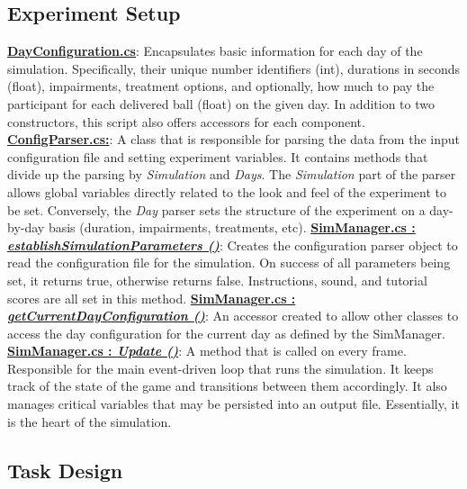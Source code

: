 \documentclass{article}
\begin{document}
\subsection*{Experiment Setup} 
\href{https://bit.ly/2FvRTWR}{\textbf{DayConfiguration.cs}}: Encapsulates basic information for each day of the simulation. Specifically, their unique number identifiers (int), durations in seconds (float), impairments, treatment options, and optionally, how much to pay the participant for each delivered ball (float) on the given day. In addition to two constructors, this script also offers accessors for each component. \newline \newline
\href{https://bit.ly/2TZaLYj}{\textbf{ConfigParser.cs:}}: A class that is responsible for parsing the data from the input configuration file and setting experiment variables. It contains methods that divide up the parsing by \textit{Simulation} and \textit{Days}. The \textit{Simulation} part of the parser allows global variables directly related to the look and feel of the experiment to be set. Conversely, the \textit{Day} parser sets the structure of the experiment on a day-by-day basis (duration, impairments, treatments, etc). 
\newline \newline
\href{https://bit.ly/2UhmSzq}{\textbf{SimManager.cs : \textit{establishSimulationParameters ()}}}: Creates the configuration parser object to read the configuration file for the simulation. On success of all parameters being set, it returns true, otherwise returns false. Instructions, sound, and tutorial scores are all set in this method. \newline \newline
\href{https://bit.ly/2UhmSzq}{\textbf{SimManager.cs : \textit{getCurrentDayConfiguration ()}}}: An accessor created to allow other classes to access the day configuration for the current day as defined by the SimManager. \newline \newline
\href{https://bit.ly/2UhmSzq}{\textbf{SimManager.cs : \textit{Update ()}}}: A method that is called on every frame. Responsible for the main event-driven loop that runs the simulation. It keeps track of the state of the game and transitions between them accordingly. It also manages critical variables that may be persisted into an output file. Essentially, it is the heart of the simulation.

\subsection*{Task Design}
\end{document}
